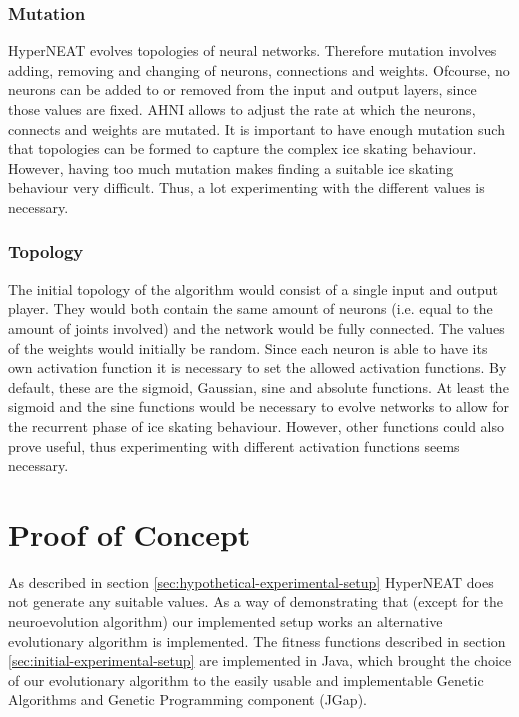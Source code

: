 \documentclass[a4paper,10pt]{article}
\begin{document}
\subsubsection{Mutation}
HyperNEAT evolves topologies of neural networks. Therefore mutation involves adding, removing and changing of neurons, connections and weights. Ofcourse, no neurons can be added to or removed from the input and output layers, since those values are fixed. AHNI allows to adjust the rate at which the neurons, connects and weights are mutated. It is important to have enough mutation such that topologies can be formed to capture the complex ice skating behaviour. However, having too much mutation makes finding a suitable ice skating behaviour very difficult. Thus, a lot experimenting with the different values is necessary. 

\subsubsection{Topology}
The initial topology of the algorithm would consist of a single input and output player. They would both contain the same amount of neurons (i.e. equal to the amount of joints involved) and the network would be fully connected. The values of the weights would initially be random. Since each neuron is able to have its own activation function it is necessary to set the allowed activation functions. By default, these are the sigmoid, Gaussian, sine and absolute functions. At least the sigmoid and the sine functions would be necessary to evolve networks to allow for the recurrent phase of ice skating behaviour. However, other functions could also prove useful, thus experimenting with different activation functions seems necessary.

\section{Proof of Concept}
\label{sec:proof-of-concept}
As described in section \ref{sec:hypothetical-experimental-setup} HyperNEAT does not generate any suitable values. As a way of demonstrating that (except for the neuroevolution algorithm) our implemented setup works an alternative evolutionary algorithm is implemented. The fitness functions described in section \ref{sec:initial-experimental-setup} are implemented in Java, which brought the choice of our evolutionary algorithm to the easily usable and implementable Genetic Algorithms and Genetic Programming component (JGap). 
\end{document}
